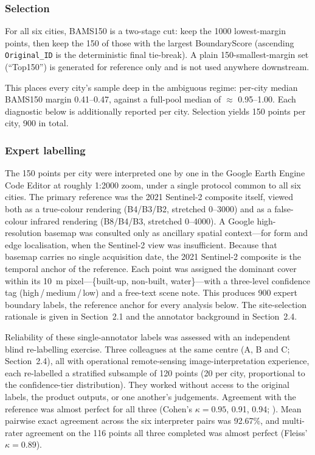 \subsubsection*{Selection}

For all six cities, BAMS150 is a two-stage cut: keep the 1000 lowest-margin
points, then keep the 150 of those with the largest BoundaryScore (ascending
\texttt{Original\_ID} is the deterministic final tie-break). A plain
150-smallest-margin set (``Top150'') is generated for reference only and is not
used anywhere downstream.

This places every city's sample deep in the ambiguous regime: per-city median
BAMS150 margin 0.41--0.47, against a full-pool median of $\approx$ 0.95--1.00.
Each diagnostic below is additionally reported per city. Selection yields 150
points per city, 900 in total.

\subsubsection*{Expert labelling}

The 150 points per city were interpreted one by one in the Google Earth Engine
Code Editor at roughly 1:2000 zoom, under a single protocol common to all six
cities. The primary reference was the 2021 Sentinel-2 composite itself, viewed
both as a true-colour rendering (B4/B3/B2, stretched 0--3000) and as a
false-colour infrared rendering (B8/B4/B3, stretched 0--4000). A Google
high-resolution basemap was consulted only as ancillary spatial context---for
form and edge localisation, when the Sentinel-2 view was insufficient. Because
that basemap carries no single acquisition date, the 2021 Sentinel-2 composite
is the temporal anchor of the reference. Each point was assigned the dominant
cover within its 10~m pixel---\{built-up, non-built, water\}---with a three-level
confidence tag (high\,/\,medium\,/\,low) and a free-text scene note. This
produces 900 expert boundary labels, the reference anchor for every analysis
below. The site-selection rationale is given in Section~2.1 and the annotator
background in Section~2.4.

Reliability of these single-annotator labels was assessed with an independent
blind re-labelling exercise. Three colleagues at the same centre (A, B and C;
Section~2.4), all with operational remote-sensing image-interpretation
experience, each re-labelled a stratified subsample of 120 points (20 per city,
proportional to the confidence-tier distribution). They worked without access to
the original labels, the product outputs, or one another's judgements. Agreement
with the reference was almost perfect for all three (Cohen's $\kappa = 0.95$,
0.91, 0.94; \citealp{landis1977}). Mean pairwise exact agreement across the six
interpreter pairs was 92.67\%, and multi-rater agreement on the 116 points all
three completed was almost perfect (Fleiss' $\kappa = 0.89$).


